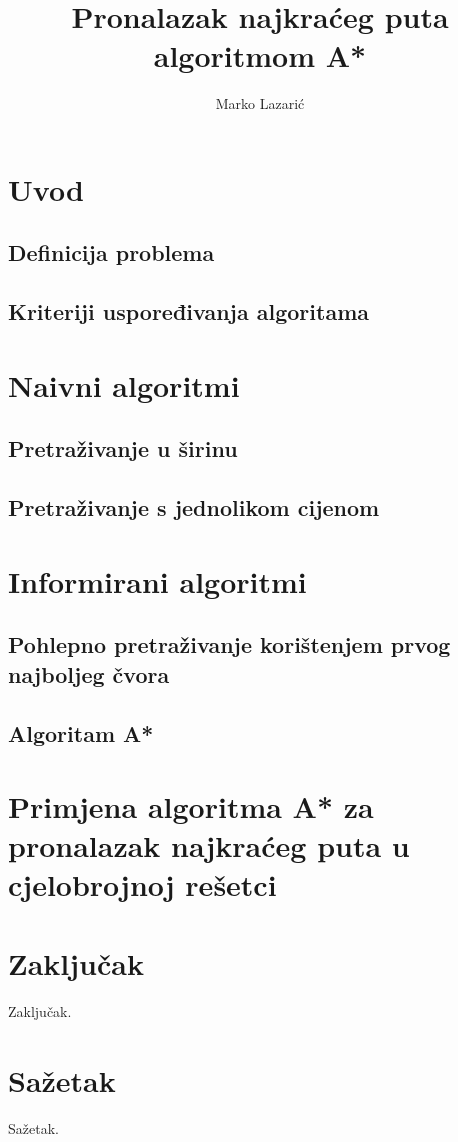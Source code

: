 \documentclass[times, utf8, seminar, numeric]{fer}
\begin{document}
\nocite{*}

\title{Pronalazak najkraćeg puta algoritmom A*}

\author{Marko Lazarić}


\maketitle

\tableofcontents

\chapter{Uvod}

\section{Definicija problema}

\section{Kriteriji uspoređivanja algoritama}


\chapter{Naivni algoritmi}


\section{Pretraživanje u širinu}


\section{Pretraživanje s jednolikom cijenom}


\chapter{Informirani algoritmi}
\section{Pohlepno pretraživanje korištenjem prvog najboljeg čvora}
\section{Algoritam A*}

\chapter{Primjena algoritma A* za pronalazak najkraćeg puta u cjelobrojnoj rešetci}

\chapter{Zaključak}
Zaključak.




\chapter{Sažetak}
Sažetak.
\end{document}
